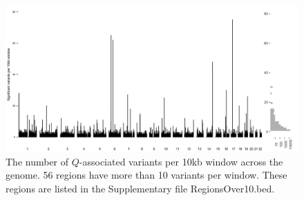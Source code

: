\documentclass[9pt,lineno]{elife}
\begin{document}
\begin{figure}[h]
\centering
\includegraphics[width=15cm,keepaspectratio]{./Figures/VariantDensity.jpg}
\caption{The number of $Q$-associated variants per 10kb window across the genome. 
56 regions have more than 10 variants per window. 
These regions are listed in the Supplementary file RegionsOver10.bed.}  
\label{VariantDensity}
\end{figure}
\end{document}
